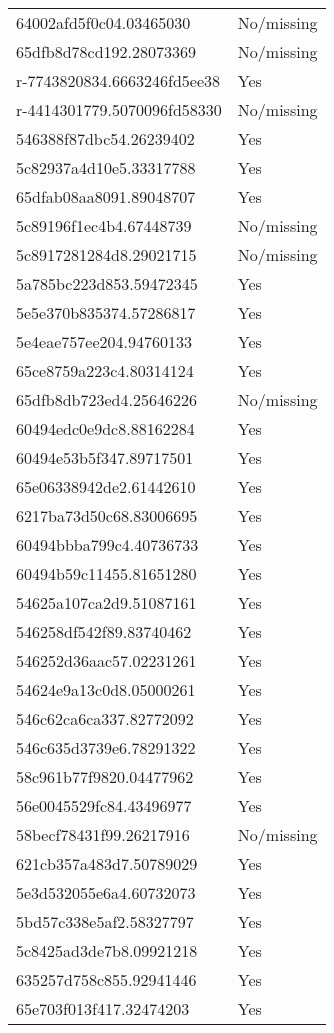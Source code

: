 \begin{tabular}{ll}
64002afd5f0c04.03465030 & No/missing \\
65dfb8d78cd192.28073369 & No/missing \\
r-7743820834.6663246fd5ee38 & Yes \\
r-4414301779.5070096fd58330 & No/missing \\
546388f87dbc54.26239402 & Yes \\
5c82937a4d10e5.33317788 & Yes \\
65dfab08aa8091.89048707 & Yes \\
5c89196f1ec4b4.67448739 & No/missing \\
5c8917281284d8.29021715 & No/missing \\
5a785bc223d853.59472345 & Yes \\
5e5e370b835374.57286817 & Yes \\
5e4eae757ee204.94760133 & Yes \\
65ce8759a223c4.80314124 & Yes \\
65dfb8db723ed4.25646226 & No/missing \\
60494edc0e9dc8.88162284 & Yes \\
60494e53b5f347.89717501 & Yes \\
65e06338942de2.61442610 & Yes \\
6217ba73d50c68.83006695 & Yes \\
60494bbba799c4.40736733 & Yes \\
60494b59c11455.81651280 & Yes \\
54625a107ca2d9.51087161 & Yes \\
546258df542f89.83740462 & Yes \\
546252d36aac57.02231261 & Yes \\
54624e9a13c0d8.05000261 & Yes \\
546c62ca6ca337.82772092 & Yes \\
546c635d3739e6.78291322 & Yes \\
58c961b77f9820.04477962 & Yes \\
56e0045529fc84.43496977 & Yes \\
58becf78431f99.26217916 & No/missing \\
621cb357a483d7.50789029 & Yes \\
5e3d532055e6a4.60732073 & Yes \\
5bd57c338e5af2.58327797 & Yes \\
5c8425ad3de7b8.09921218 & Yes \\
635257d758c855.92941446 & Yes \\
65e703f013f417.32474203 & Yes \\

\end{tabular}

